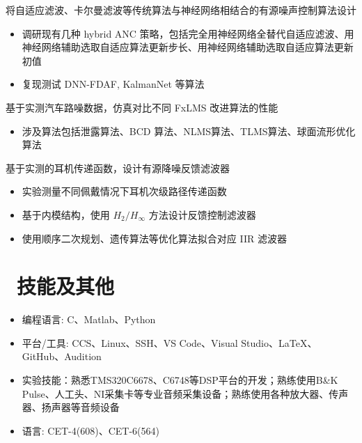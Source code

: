 \documentclass{resume}
\begin{document}
\begin{onehalfspacing}
将自适应滤波、卡尔曼滤波等传统算法与神经网络相结合的有源噪声控制算法设计
\begin{itemize}
  \item 调研现有几种 hybrid ANC 策略，包括完全用神经网络全替代自适应滤波、用神经网络辅助选取自适应算法更新步长、用神经网络辅助选取自适应算法更新初值
  \item 复现测试 DNN-FDAF, KalmanNet 等算法
\end{itemize}

基于实测汽车路噪数据，仿真对比不同 FxLMS 改进算法的性能
\begin{itemize}
  \item 涉及算法包括泄露算法、BCD 算法、NLMS算法、TLMS算法、球面流形优化算法
\end{itemize}

基于实测的耳机传递函数，设计有源降噪反馈滤波器
\begin{itemize}
  \item 实验测量不同佩戴情况下耳机次级路径传递函数
  \item 基于内模结构，使用 $H_2/H_\infty$ 方法设计反馈控制滤波器
  \item 使用顺序二次规划、遗传算法等优化算法拟合对应 IIR 滤波器
\end{itemize}
\end{onehalfspacing}


\section{\ 技能及其他}
\begin{onehalfspacing}
\begin{itemize}[parsep=0.5ex]
  \item 编程语言: C、Matlab、Python
  \item 平台/工具: CCS、Linux、SSH、VS Code、Visual Studio、LaTeX、GitHub、Audition
  \item 实验技能：熟悉TMS320C6678、C6748等DSP平台的开发；熟练使用B\&K Pulse、人工头、NI采集卡等专业音频采集设备；熟练使用各种放大器、传声器、扬声器等音频设备
  \item 语言: CET-4(608)、CET-6(564)
\end{itemize}
\end{onehalfspacing}
\end{document}
